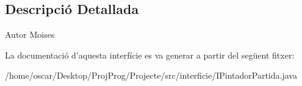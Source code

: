 \subsection{Descripció Detallada}
\begin{DoxyAuthor}{Autor}
Moises 
\end{DoxyAuthor}


La documentació d'aquesta interfície es va generar a partir del següent fitxer\+:\begin{DoxyCompactItemize}
\item 
/home/oscar/\+Desktop/\+Proj\+Prog/\+Projecte/src/interficie/I\+Pintador\+Partida.\+java\end{DoxyCompactItemize}
